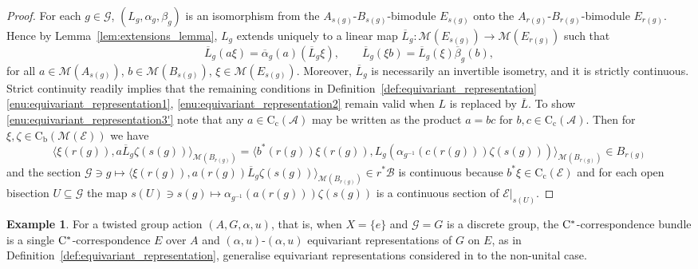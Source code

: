 \documentclass[11 pt, leqno]{amsart}
\numberwithin{equation}{section}
\theoremstyle{plain}
\theoremstyle{definition}
\newtheorem{ex}[thm]{Example}
\newcommand*{\contc}{\mathrm{C_c}}%
\newcommand*{\contb}{\mathrm{C_b}}%
\newcommand{\B}{\mathcal B}
\newcommand{\M}{\mathcal M}
\newcommand{\G}{\mathcal G} %
\newcommand{\EE}{\mathcal E}
\newcommand{\A}{\mathcal A}
\newcommand{\cst}{\ifmmode\mathrm{C}^*\else{$\mathrm{C}^*$}\fi}
\begin{document}
\begin{proof} 
For each $g\in \G$, $(L_{g},\alpha_g,\beta_g)$ is an isomorphism from the $A_{s(g)}$-$B_{s(g)}$-bimodule $E_{s(g)}$ onto the $A_{r(g)}$-$B_{r(g)}$-bimodule $E_{r(g)}$. 
Hence by Lemma~\ref{lem:extensions_lemma}, $L_g$ extends uniquely to a linear map $\overline{L}_{g}:\M(E_{s(g)})\to \M(E_{r(g)})$ such that  
\[
    \overline{L}_{g} (a \xi)=\overline{\alpha}_{g}(a)  (\overline{L}_{g}\xi) , \qquad 
    \overline{L}_{g}(\xi b)=\overline{L}_{g}(\xi) \overline{\beta}_{g}(b),
\]
for all $a\in \M(A_{s(g)})$, $b\in \M(B_{s(g)})$, $\xi \in \M(E_{s(g)})$.
Moreover, $\overline{L}_{g}$ is necessarily an invertible isometry, and it is strictly continuous. 
Strict continuity readily implies that the remaining conditions in Definition~\ref{def:equivariant_representation}\ref{enu:equivariant_representation1}, \ref{enu:equivariant_representation2} remain valid when $L$ is replaced by $\overline{L}$. 
To show \ref{enu:equivariant_representation3'} note that any $a\in \contc(\A)$ may be written as the product $a=bc$ for $b,c\in \contc(\A)$. 
Then for $\xi, \zeta \in \contb(\M(\EE))$ we have
\[
    \langle \xi(r(g)),a \overline{L}_g \zeta(s(g))\rangle_{\M(B_{r(g)})}=\langle b^*(r(g))\xi(r(g)), L_g(\alpha_{g^{-1}}(c(r(g)))\zeta(s(g)))\rangle_{\M(B_{r(g)})}\in B_{r(g)}
\]
and  the section $\G\ni g \longmapsto \langle \xi(r(g)),a(r(g)) \overline{L}_g \zeta(s(g))\rangle_{\M(B_{r(g)})} \in r^*\B$ is continuous because $b^*\xi\in \contc(\EE)$ and for each open bisection $U\subseteq \G$ the map $s(U)\ni s(g) \mapsto \alpha_{g^{-1}}(a(r(g)))\zeta(s(g))$ is a continuous section of $\EE|_{s(U)}$.
\end{proof}


\begin{ex}
For a twisted group action $(A,G,\alpha,u)$, that is, when $X=\{e\}$ and $\G=G$ is a discrete group, the $\cst$-correspondence bundle is a single $\cst$-correspondence $E$ over $A$ and  $(\alpha,u)$-$(\alpha,u)$ equivariant representations of $G$ on $E$, as in Definition~\ref{def:equivariant_representation}, generalise equivariant representations considered in \cite{BedosConti} to the non-unital case. 
\end{ex}
\end{document}
